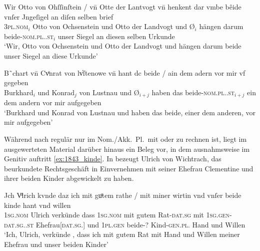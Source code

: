 \begin{exe}
\ex \label{ex:vvfinctrl2}
	\begin{xlist}
	\ex \label{ex:vvfinctrl2_1}
		\gll Wir Otto von Ohſſinſtein / vn̄ Otte der Lantvogt
				\textelp{} vn̄ {} henkent {dar vmbe} bêide vnſer
				Jngeſigel an diſen selben brief \\
			\textsc{3pl\subM.nom}$_i$ Otto von Ochsenstein {} und Otto der Landvogt
				{} und Ø$_i$ hängen darum beide-\textsc{nom.pl.\MascM.st}$_i$ unser
				Siegel an diesen selben Urkunde \\
		\trans `Wir, Otto von Ochsenstein und Otto der Landvogt \textelp{}
			und  hängen darum beide unser Siegel an diese Urkunde'
			\parencites(Nr.~1145, Burg Ochsenstein, Dépt.~Bas-Rhin, 1289)[427,5--6]{cao2}

	\ex \label{ex:vvfinctrl2_2}
		\gll B˜chart vn̄ Cvͦnrat von lv̓ſtenowe
				\textelp{} vn̄ {} hant dc beide / ain dem
				adern vor mir {vf gegeben} \\				
			Burkhard$_i$ und Konrad$_j$ von Lustnau {} und Ø$_{i+j}$ haben das
				beide-\textsc{nom.pl.\MascM.st}$_{i+j}$ {} ein dem andern vor mir
				aufgegeben \\
		\trans `Burkhard und Konrad von Lustnau \textelp{} und
			 haben das beide, einer dem anderen, vor mir
			aufgegeben'
			\parencites(Nr.~2607, Tübingen, 1297)[32,41--33,1]{cao4}
	\end{xlist}
\end{exe}

\label{phsec:beidegen}
Während nach \citet[623]{ksw2} regulär nur im Nom./Akk.~Pl.\ mit 
oder  zu rechnen ist, liegt im ausgewerteten Material darüber
hinaus ein Beleg vor, in dem  ausnahmsweise im Genitiv auftritt
\cref{ex:1843_kinde}. In  \autocite{cao3} bezeugt
Ulrich von Wichtrach, das beurkundete Rechtsgeschäft in Einvernehmen mit seiner
Ehefrau Clementine und ihrer beiden Kinder abgewickelt zu haben.

\begin{exe}
\ex\label{ex:1843_kinde}
	\gll Jch Vͦlrich \textelp{} kvnde \textelp{} daz ich mit guͦtem rathe
			/ mit miner wirtin \textelp{} vnd vnſer beide kinde hant
			vnd willen \\
		\textsc{1sg\subM.nom} Ulrich {} verkünde {} dass \textsc{1sg\subM.nom} mit gutem
			Rat-\textsc{dat.sg} {} mit \textsc{1sg\subM.gen-dat.sg.\FemF.st}
			Ehefrau[\textsc{dat.sg.\FemF}] {} und \textsc{1pl\subMF.gen} beide-?
			Kind-\textsc{gen.pl.\NeutA} Hand und Willen \\
	\trans `Ich, Ulrich, \textelp{} verkünde \textelp{}, dass ich mit
		gutem Rat  mit Hand und Willen meiner Ehefrau \textelp{}
		und unser beiden Kinder'
		\parencites(Nr.~1843, Thun, Kt.~Bern, 1293)[146,11--13]{cao3}
\end{exe}


